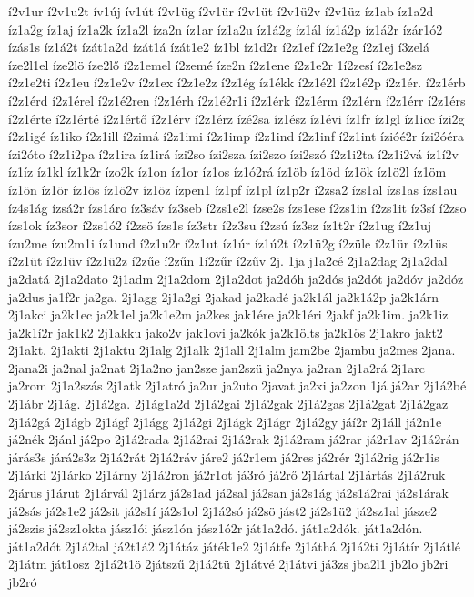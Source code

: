 {í2v1ur
í2v1u2t
ív1új
ív1út
í2v1üg
í2v1ür
í2v1üt
í2v1ü2v
í2v1üz
íz1ab
íz1a2d
íz1a2g
íz1aj
íz1a2k
íz1a2l
íza2n
íz1ar
íz1a2u
íz1á2g
íz1ál
íz1á2p
íz1á2r
ízár1ó2
ízás1s
íz1á2t
ízát1a2d
ízát1á
ízát1e2
íz1bl
íz1d2r
í2z1ef
í2z1e2g
í2z1ej
í3zelá
íze2l1el
íze2lö
íze2lő
í2z1emel
í2zemé
íze2n
í2z1ene
í2z1e2r
1í2zesí
í2z1e2sz
í2z1e2ti
í2z1eu
í2z1e2v
í2z1ex
í2z1e2z
í2z1ég
íz1ékk
í2z1é2l
í2z1é2p
í2z1ér.
í2z1érb
í2z1érd
í2z1érel
í2z1é2ren
í2z1érh
í2z1é2r1i
í2z1érk
í2z1érm
í2z1érn
í2z1érr
í2z1érs
í2z1érte
í2z1érté
í2z1értő
í2z1érv
í2z1érz
ízé2sa
íz1ész
íz1évi
íz1fr
íz1gl
íz1icc
ízi2g
í2z1igé
íz1iko
í2z1ill
í2zimá
í2z1imi
í2z1imp
í2z1ind
í2z1inf
í2z1int
ízióé2r
ízi2óéra
ízi2óto
í2z1i2pa
í2z1ira
íz1irá
ízi2so
ízi2sza
ízi2szo
ízi2szó
í2z1i2ta
í2z1i2vá
íz1í2v
íz1íz
íz1kl
íz1k2r
ízo2k
íz1on
íz1or
íz1os
íz1ó2rá
íz1öb
íz1öd
íz1ök
íz1ö2l
íz1öm
íz1ön
íz1ör
íz1ös
íz1ö2v
íz1öz
ízpen1
íz1pf
íz1pl
íz1p2r
í2zsa2
ízs1al
ízs1as
ízs1au
íz4s1ág
ízsá2r
ízs1áro
íz3sáv
íz3seb
í2zs1e2l
ízse2s
ízs1ese
í2zs1in
í2zs1it
íz3sí
í2zso
ízs1ok
íz3sor
í2zs1ó2
í2zsö
ízs1s
íz3str
í2z3su
í2zsú
íz3sz
íz1t2r
í2z1ug
í2z1uj
ízu2me
ízu2m1i
íz1und
í2z1u2r
í2z1ut
íz1úr
íz1ú2t
í2z1ü2g
í2züle
í2z1ür
í2z1üs
í2z1üt
í2z1üv
í2z1ü2z
í2zűe
í2zűn
1í2zűr
í2zűv
2j.
1ja
j1a2cé
2j1a2dag
2j1a2dal
ja2datá
2j1a2dato
2j1adm
2j1a2dom
2j1a2dot
ja2dóh
ja2dós
ja2dót
ja2dóv
ja2dóz
ja2dus
ja1f2r
ja2ga.
2j1agg
2j1a2gi
2jakad
ja2kadé
ja2k1ál
ja2k1á2p
ja2k1árn
2j1akci
ja2k1ec
ja2k1el
ja2k1e2m
ja2kes
jak1ére
ja2k1éri
2jakf
ja2k1im.
ja2k1iz
ja2k1í2r
jak1k2
2j1akku
jako2v
jak1ovi
ja2kók
ja2k1ölts
ja2k1ös
2j1akro
jakt2
2j1akt.
2j1akti
2j1aktu
2j1alg
2j1alk
2j1all
2j1alm
jam2be
2jambu
ja2mes
2jana.
2jana2i
ja2nal
ja2nat
2j1a2no
jan2sze
jan2szü
ja2nya
ja2ran
2j1a2rá
2j1arc
ja2rom
2j1a2szás
2j1atk
2j1atró
ja2ur
ja2uto
2javat
ja2xi
ja2zon
1já
já2ar
2j1á2bé
2j1ábr
2j1ág.
2j1á2ga.
2j1ág1a2d
2j1á2gai
2j1á2gak
2j1á2gas
2j1á2gat
2j1á2gaz
2j1á2gá
2j1ágb
2j1ágf
2j1ágg
2j1á2gi
2j1ágk
2j1ágr
2j1á2gy
jáí2r
2j1áll
já2n1e
já2nék
2jánl
já2po
2j1á2rada
2j1á2rai
2j1á2rak
2j1á2ram
já2rar
já2r1av
2j1á2rán
járás3s
járá2s3z
2j1á2rát
2j1á2ráv
járe2
já2r1em
já2res
já2rér
2j1á2rig
já2r1is
2j1árki
2j1árko
2j1árny
2j1á2ron
já2r1ot
já3ró
já2rő
2j1ártal
2j1ártás
2j1á2ruk
2járus
j1árut
2j1árvál
2j1árz
já2s1ad
já2sal
já2san
já2s1ág
já2s1á2rai
já2s1árak
já2sás
já2s1e2
já2sit
já2s1í
já2s1ol
2j1á2só
já2sö
jást2
já2s1ü2
já2sz1al
jásze2
já2szis
já2sz1okta
jász1ói
jász1ón
jász1ó2r
ját1a2dó.
ját1a2dók.
ját1a2dón.
ját1a2dót
2j1á2tal
já2t1á2
2j1átáz
játék1e2
2j1átfe
2j1áthá
2j1á2ti
2j1átír
2j1átlé
2j1átm
ját1osz
2j1á2t1ö
2játszű
2j1á2tü
2j1átvé
2j1átvi
já3zs
jba2l1
jb2lo
jb2ri
jb2ró
}

